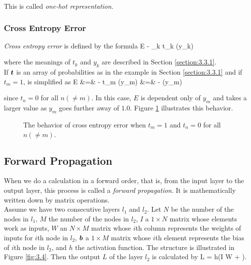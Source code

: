 \documentclass{article}
\theoremstyle{definition}
\newcommand{\sect}[1]{Section \ref{section:#1}}
\newcommand{\fig}[1]{Figure \ref{fig:#1}}
\begin{document}
This is called {\it one-hot representation}.

\subsubsection{Cross Entropy Error} \label{section:3.3.2}

{\it Cross entropy error} is defined by the formula
\begineq
E \equiv - \sum _k t_k \ln (y_k) 
\edeq

where the meanings of $t_k$ and $y_k$ are described in \sect{3.3.1}.\\

If $\bmt$ is an array of probabilities as in the example in \sect{3.3.1} and if $t_m = 1$,  is simplified as
\begineq
E &=& - t_m \ln (y_m) \no
&=& - \ln (y_m) 
\edeq

since $t_n = 0$ for all $n (\neq m)$. In this case, $E$ is dependent only of $y_m$ and takes a larger value as $y_m$ goes further away of $1.0$. \fig{3.3} illustrates this behavior.

\begin{figure}[H]
    \centering
    \begin{subfigure}[H]{1.0\textwidth}
	\end{subfigure}
    \caption{The behavior of cross entropy error when $t_m = 1$ and $t_n = 0$ for all $n (\neq m)$.}
    \label{fig:3.3}
\end{figure}

\subsection{Forward Propagation} \label{section:3.4}

When we do a calculation in a forward order, that is, from the input layer to the output layer, this process is called a {\it forward propagation}. It is mathematically written down by matrix operations.\\

Assume we have two consecutive layers $l_1$ and $l_2$. Let $N$ be the number of the nodes in $l_1$, $M$ the number of the nodes in $l_2$, $I$ a $1 \times N$ matrix whose elements work as inputs, $W$ an $N \times M$ matrix whose $i$th column represents the weights of inputs for $i$th node in $l_2$, $\bmb$ a $1 \times M$ matrix whose $i$th element represents the bias of $i$th node in $l_2$, and $h$ the activation function. The structure is illustrated in \fig{3.4}. Then the output $L$ of the layer $l_2$ is calculated by
\begineq
L = h(I W + \bmb). 
\edeq
\end{document}
